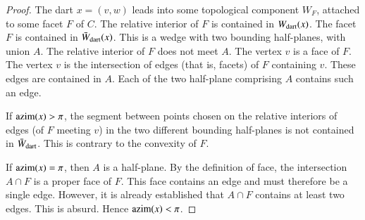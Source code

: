 \begin{proof}   The dart $x=(v,w)$ leads into some topological component $W_F$, attached to some facet $F$ of $C$.  The relative interior of $F$ is contained in $W_{\text{dart}}(x)$.  The facet $F$ is contained in $\bar W_{\text{dart}}(x)$. This is a wedge with two bounding half-planes, with union $A$.  The relative interior of $F$ does not meet $A$.   The vertex $v$ is a face of $F$.  The vertex $v$ is the intersection of edges (that is, facets) of $F$ containing $v$.  These edges are contained in $A$.  Each of the two half-plane comprising $A$ contains such an edge. 

If ${\operatorname{azim}}(x)>\pi$, the segment between points chosen on the relative interiors of edges (of $F$ meeting $v$) in the two different bounding half-planes is not contained in $\bar W_{\text{dart}}$.  This is contrary to the convexity of $F$.

If ${\operatorname{azim}}(x)=\pi$, then $A$ is a half-plane.  By the definition of face, the intersection $A\cap F$ is a proper face of $F$.  This face contains an edge and must therefore be a single edge.  However, it is already established that $A\cap F$ contains at least two edges.  This is absurd.  Hence ${\operatorname{azim}}(x)<\pi$.
\end{proof}


